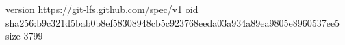 version https://git-lfs.github.com/spec/v1
oid sha256:b9c321d5bab0b8ef58308948cb5c923768eeda03a934a89ea9805e8960537ee5
size 3799
